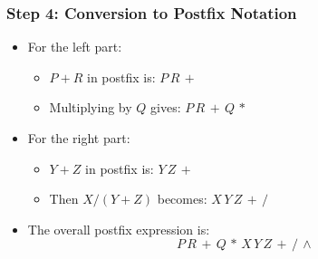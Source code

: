 \documentclass[12pt]{article}
\begin{document}
\subsubsection*{Step 4: Conversion to Postfix Notation}
\begin{itemize}[label=$\bullet$]
    \item For the left part:
          \begin{itemize}[label=$\circ$]
              \item $P+R$ in postfix is: $P\,R\,+$
              \item Multiplying by $Q$ gives: $P\,R\,+\,Q\,*$
          \end{itemize}
    \item For the right part:
          \begin{itemize}[label=$\circ$]
              \item $Y+Z$ in postfix is: $Y\,Z\,+$
              \item Then $X/(Y+Z)$ becomes: $X\,Y\,Z\,+\,/$
          \end{itemize}
    \item The overall postfix expression is:
          \[
              P\,R\,+\,Q\,*\,X\,Y\,Z\,+\,/\,\wedge
          \]
\end{itemize}
\end{document}
